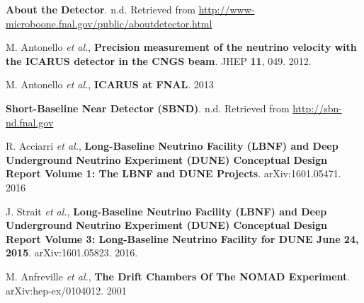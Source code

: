 
 \textbf{About the Detector}. n.d. Retrieved from \href{http://www-microboone.fnal.gov/public/aboutdetector.html}{http://www-microboone.fnal.gov/public/aboutdetector.html}

 M. Antonello \textit{et al.}, \textbf{Precision measurement of the neutrino velocity with the ICARUS detector in the CNGS beam}. JHEP \textbf{11}, 049. 2012.

 M. Antonello \textit{et al.}, \textbf{ICARUS at FNAL}. 2013

 \textbf{Short-Baseline Near Detector (SBND)}. n.d. Retrieved from \href{http://sbn-nd.fnal.gov}{http://sbn-nd.fnal.gov}


 R. Acciarri \textit{et al.}, \textbf{Long-Baseline Neutrino Facility (LBNF) and Deep Underground Neutrino Experiment (DUNE) Conceptual Design Report Volume 1: The LBNF and DUNE Projects}. 	arXiv:1601.05471. 2016 

 J. Strait \textit{et al.}, \textbf{Long-Baseline Neutrino Facility (LBNF) and Deep Underground Neutrino Experiment (DUNE) Conceptual Design Report Volume 3: Long-Baseline Neutrino Facility for DUNE June 24, 2015}. arXiv:1601.05823. 2016.

 M. Anfreville \textit{et al.}, \textbf{The Drift Chambers Of The NOMAD Experiment}. 	arXiv:hep-ex/0104012. 2001







